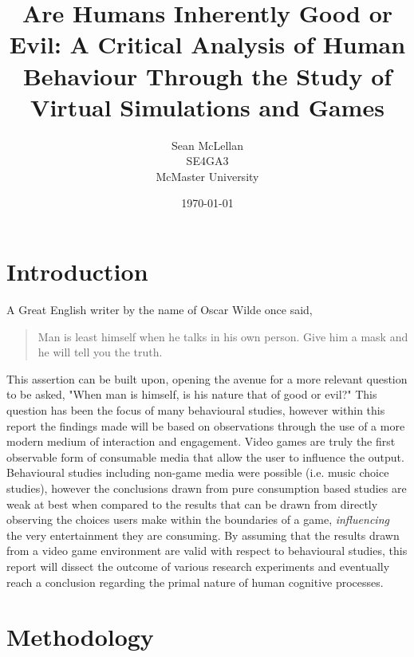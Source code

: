 \documentclass[12pt]{report}
\title{Are Humans Inherently Good or Evil: A Critical Analysis of Human Behaviour Through the Study of Virtual Simulations and Games}
\author{Sean McLellan\\ SE4GA3\\ McMaster University}
\date{\today}
\begin{document}
\maketitle
\tableofcontents

\chapter{Introduction}
A Great English writer by the name of Oscar Wilde once said,
\begin{quotation}
Man is least himself when he talks in his own person. Give him a mask and he will tell you the truth.
\end{quotation}
This assertion can be built upon, opening the avenue for a more relevant question to be asked, "When man is himself, is his nature that of good or evil?"
This question has been the focus of many behavioural studies, however within this report the findings made will be based on observations through the use of a more modern medium of interaction and engagement. Video games are truly the first observable form of consumable media that allow the user to influence the output. Behavioural studies including non-game media were possible (i.e. music choice studies), however the conclusions drawn from pure consumption based studies are weak at best when compared to the results that can be drawn from directly observing the choices users make within the boundaries of a game, \textit{influencing} the very entertainment they are consuming. By assuming that the results drawn from a video game environment are valid with respect to behavioural studies, this report will dissect the outcome of various research experiments and eventually reach a conclusion regarding the primal nature of human cognitive processes.

\chapter{Methodology}
\end{document}
